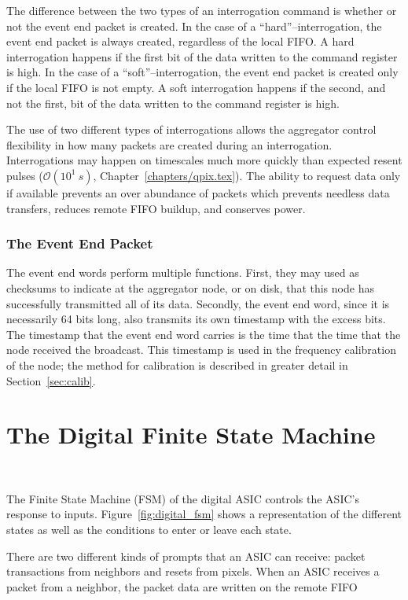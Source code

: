 The difference between the two types of an interrogation command is whether or not the event end packet is created.
In the case of a ``hard''--interrogation, the event end packet is always created, regardless of the local FIFO.
A hard interrogation happens if the first bit of the data written to the command register is high.
In the case of a ``soft''--interrogation, the event end packet is created only if the local FIFO is not empty.
A soft interrogation happens if the second, and not the first, bit of the data written to the command register is high.

The use of two different types of interrogations allows the aggregator control flexibility in how many packets are created during an interrogation.
Interrogations may happen on timescales much more quickly than expected resent pulses ($\mathcal{O}(10^{1}~\unit{s})$, Chapter~\ref{chapters/qpix.tex}).
The ability to request data only if available prevents an over abundance of packets which prevents needless data transfers, reduces remote FIFO buildup, and conserves power.

\subsubsection{The Event End Packet}

The event end words perform multiple functions.
First, they may used as checksums to indicate at the aggregator node, or on disk, that this node has successfully transmitted all of its data.
Secondly, the event end word, since it is necessarily 64 bits long, also transmits its own timestamp with the excess bits.
The timestamp that the event end word carries is the time that the time that the node received the broadcast.
This timestamp is used in the frequency calibration of the node; the method for calibration is described in greater detail in Section~\ref{sec:calib}.

\section{The Digital Finite State Machine}~\label{sec:digital_fsm}

The Finite State Machine (FSM) of the digital ASIC controls the ASIC's response to inputs.
Figure~\ref{fig:digital_fsm} shows a representation of the different states as well as the conditions to enter or leave each state.

There are two different kinds of prompts that an ASIC can receive: packet transactions from neighbors and resets from pixels.
When an ASIC receives a packet from a neighbor, the packet data are written on the remote FIFO

